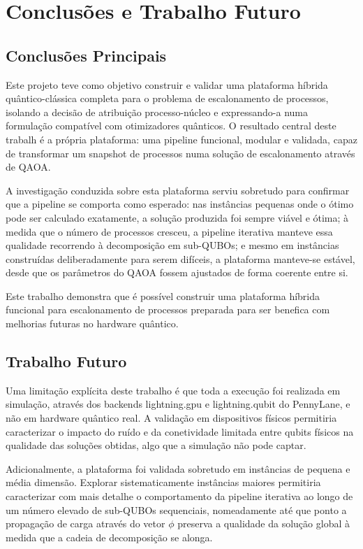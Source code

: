 \chapter{Conclusões e Trabalho Futuro}
\label{chap:conc-trab-futuro}

\section{Conclusões Principais}
\label{sec:conc-princ}

Este projeto teve como objetivo construir e validar uma plataforma híbrida quântico-clássica completa para o problema de escalonamento de processos, isolando a decisão de atribuição processo-núcleo e expressando-a numa formulação compatível com otimizadores quânticos. O resultado central deste trabalh é a própria plataforma: uma pipeline funcional, modular e validada, capaz de transformar um snapshot de processos numa solução de escalonamento através de QAOA.

A investigação conduzida sobre esta plataforma serviu sobretudo para confirmar que a pipeline se comporta como esperado: nas instâncias pequenas onde o ótimo pode ser calculado exatamente, a solução produzida foi sempre viável e ótima; à medida que o número de processos cresceu, a pipeline iterativa manteve essa qualidade recorrendo à decomposição em sub-QUBOs; e mesmo em instâncias construídas deliberadamente para serem difíceis, a plataforma manteve-se estável, desde que os parâmetros do QAOA fossem ajustados de forma coerente entre si. 

Este trabalho demonstra que é possível construir uma plataforma híbrida funcional para escalonamento de processos preparada para ser benefica com melhorias futuras no hardware quântico.

\section{Trabalho Futuro}
\label{sec:trab-futuro}

Uma limitação explícita deste trabalho é que toda a execução foi realizada em simulação, através dos backends lightning.gpu e lightning.qubit do PennyLane, e não em hardware quântico real. A validação em dispositivos físicos permitiria caracterizar o impacto do ruído e da conetividade limitada entre qubits físicos na qualidade das soluções obtidas, algo que a simulação não pode captar.

Adicionalmente, a plataforma foi validada sobretudo em instâncias de pequena e média dimensão. Explorar sistematicamente instâncias maiores permitiria caracterizar com mais detalhe o comportamento da pipeline iterativa ao longo de um número elevado de sub-QUBOs sequenciais, nomeadamente até que ponto a propagação de carga através do vetor $\phi$ preserva a qualidade da solução global à medida que a cadeia de decomposição se alonga.

